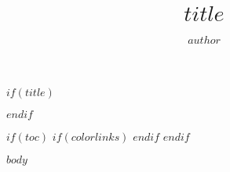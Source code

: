 \documentclass[a4paper,11pt,hidelinks,titlepage]{article}
\author{$author$}
\date{}
\title{$title$}
\begin{document}
$if(title)$
\maketitle
$endif$

$if(toc)$
$if(colorlinks)$
\hypersetup{linkcolor=$if(toccolor)$$toccolor$$else$$endif$}
$endif$
\setcounter{tocdepth}{$toc-depth$}
\tableofcontents
$endif$

$body$
\end{document}
